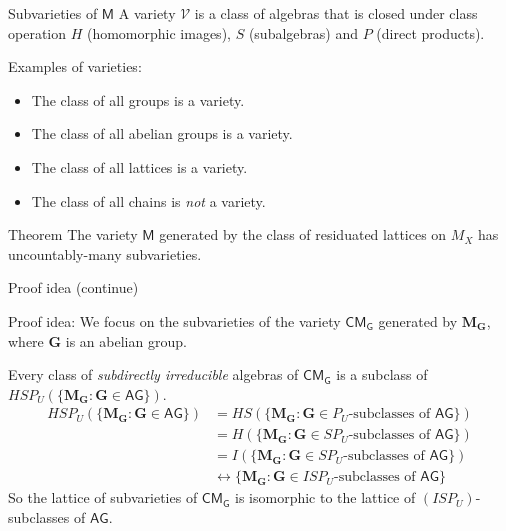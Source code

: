 \documentclass[professionalfont, handout, 12pt]{beamer} %
\theoremstyle{plain}
\theoremstyle{definition}
\newcommand{\m}[1]{{\mathbf {#1} }}
\begin{document}
\begin{frame}{Subvarieties of $\mathsf{M}$}
    A variety $\mathcal{V}$ is a class of algebras that is closed under class operation $H$ (homomorphic images), $S$ (subalgebras) and $P$ (direct products).\pause
    \medskip

    Examples of varieties:
    \begin{itemize}
        \item The class of all groups is a variety.

        \item The class of all abelian groups is a variety.

        \item The class of all lattices is a variety.

        \item The class of all chains is \emph{not} a variety.
    \end{itemize}

    \begin{block}{Theorem}
        The variety $\mathsf{M}$ generated by the class of residuated lattices on $M_X$ has uncountably-many subvarieties.
    \end{block}
\end{frame}

\begin{frame}{Proof idea (continue)}


    Proof idea: We focus on the subvarieties of the variety $\mathsf{CM_G}$ generated by $\m {M_G}$, where $\m G$ is an abelian group.\pause
    \medskip
    
    Every class of \emph{subdirectly irreducible} algebras of $\mathsf{CM_G}$ is a subclass of $HSP_U(\{\m {M_G}: \m G \in \mathsf{AG}\})$.
    \begin{align*}
        HSP_U(\{\m {M_G}: \m G \in \mathsf{AG}\}) & = HS(\{\m {M_G}: \m G \in P_U \text{-subclasses of } \mathsf{AG}\})\\
        & = H(\{\m {M_G}: \m G \in {SP_U} \text{-subclasses of } \mathsf{AG}\})\\
        & = I(\{\m {M_G}: \m G \in {SP_U} \text{-subclasses of } \mathsf{AG}\})\\
        & \leftrightarrow \{\m {M_G}: \m G \in {ISP_U} \text{-subclasses of } \mathsf{AG}\}
    \end{align*}
    \pause
    So the lattice of subvarieties of $\mathsf{CM_G}$ is isomorphic to the lattice of $(ISP_U)$-subclasses of $\mathsf{AG}$.
\end{frame}
\end{document}
